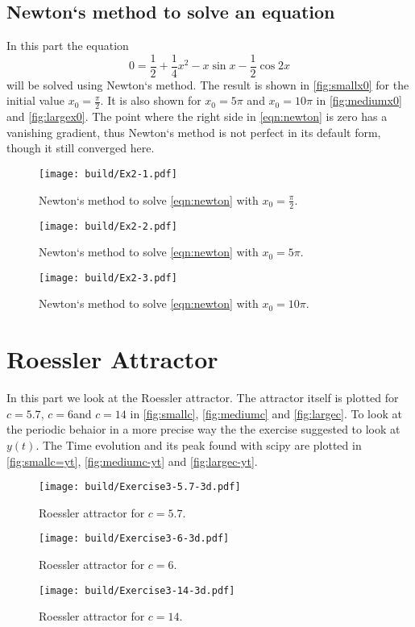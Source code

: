 \documentclass[twocolumn]{article}
\begin{document}
\subsection{Newton`s method to solve an equation}
In this part the equation
\begin{equation}
  0 = \frac12 + \frac14 x^2 - x \sin x - \frac12 \cos 2x
  \label{eqn:newton}
\end{equation}
will be solved using Newton`s method. The result is shown in \autoref{fig:smallx0} for the initial value $x_0 =
\frac{\pi}{2}$. It is also shown for $x_0 = 5 \pi$ and $x_0 = 10 \pi$ in \autoref{fig:mediumx0} and
\autoref{fig:largex0}. The point where the right side in \autoref{eqn:newton} is zero has a vanishing gradient, thus Newton`s method is not perfect
in its default form, though it still converged here.
\begin{figure}
	\centering
  \texttt{[image: build/Ex2-1.pdf]}
  \caption{Newton`s method to solve \autoref{eqn:newton} with $x_0 = \frac{\pi}{2}$.}
  \label{fig:smallx0}
\end{figure}
\begin{figure}
	\centering
  \texttt{[image: build/Ex2-2.pdf]}
  \caption{Newton`s method to solve \autoref{eqn:newton} with $x_0 = 5\pi$.}
  \label{fig:mediumx0}
\end{figure}
\begin{figure}
	\centering
  \texttt{[image: build/Ex2-3.pdf]}
  \caption{Newton`s method to solve \autoref{eqn:newton} with $x_0 = 10\pi$.}
  \label{fig:largex0}
\end{figure}

\section{Roessler Attractor}
In this part we look at the Roessler attractor. The attractor itself is plotted for $c=5.7$, $c=6$and $c=14$ in
\autoref{fig:smallc}, \autoref{fig:mediumc} and \autoref{fig:largec}. To look at the periodic behaior in a more precise
way the the exercise suggested to look at $y(t)$. The Time evolution and its peak found with scipy are plotted in
\autoref{fig:smallc=yt}, \autoref{fig:mediumc-yt} and \autoref{fig:largec-yt}.
\begin{figure}
	\centering
  \texttt{[image: build/Exercise3-5.7-3d.pdf]}
  \caption{Roessler attractor for $c = 5.7$.}
  \label{fig:smallc}
\end{figure}
\begin{figure}
	\centering
  \texttt{[image: build/Exercise3-6-3d.pdf]}
  \caption{Roessler attractor for $c = 6$.}
  \label{fig:mediumc}
\end{figure}
\begin{figure}
	\centering
  \texttt{[image: build/Exercise3-14-3d.pdf]}
  \caption{Roessler attractor for $c = 14$.}
  \label{fig:largec}
\end{figure}
\end{document}
